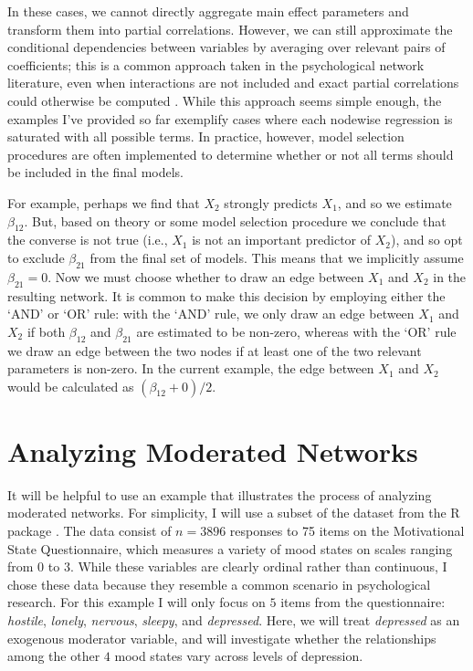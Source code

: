 In these cases, we cannot directly aggregate main effect parameters and transform them into partial correlations. However, we can still approximate the conditional dependencies between variables by averaging over relevant pairs of coefficients; this is a common approach taken in the psychological network literature, even when interactions are not included and exact partial correlations could otherwise be computed \cite{haslbeck2015mgm,epskamp2018gaussian}. While this approach seems simple enough, the examples I've provided so far exemplify cases where each nodewise regression is saturated with all possible terms. In practice, however, model selection procedures are often implemented to determine whether or not all terms should be included in the final models. 

For example, perhaps we find that $X_2$ strongly predicts $X_1$, and so we estimate $\beta_{12}$. But, based on theory or some model selection procedure we conclude that the converse is not true (i.e., $X_1$ is not an important predictor of $X_2$), and so opt to exclude $\beta_{21}$ from the final set of models. This means that we implicitly assume $\beta_{21} = 0$. Now we must choose whether to draw an edge between $X_1$ and $X_2$ in the resulting network. It is common to make this decision by employing either the `AND' or `OR' rule: with the `AND' rule, we only draw an edge between $X_1$ and $X_2$ if both $\beta_{12}$ and $\beta_{21}$ are estimated to be non-zero, whereas with the `OR' rule we draw an edge between the two nodes if at least one of the two relevant parameters is non-zero. In the current example, the edge between $X_1$ and $X_2$ would be calculated as $(\beta_{12} + 0)/2$. 

\section{Analyzing Moderated Networks}
It will be helpful to use an example that illustrates the process of analyzing moderated networks. For simplicity, I will use a subset of the  dataset from the R package  \cite{psych}. The data consist of $n = 3896$ responses to 75 items on the Motivational State Questionnaire, which measures a variety of mood states on scales ranging from $0$ to $3$. While these variables are clearly ordinal rather than continuous, I chose these data because they resemble a common scenario in psychological research. For this example I will only focus on $5$ items from the questionnaire: \textit{hostile}, \textit{lonely}, \textit{nervous}, \textit{sleepy}, and \textit{depressed}. Here, we will treat \textit{depressed} as an exogenous moderator variable, and will investigate whether the relationships among the other $4$ mood states vary across levels of depression. 

